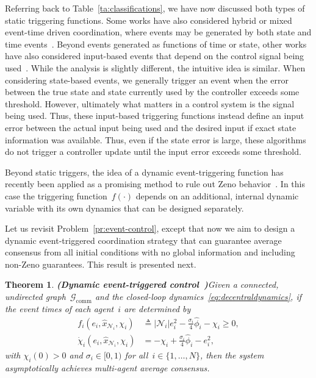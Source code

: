\documentclass{autart}
\newtheorem{theorem}{Theorem}[section]
\newcommand{\GG}{{\mathcal{G}}}
\newcommand{\NN}{{\mathcal{N}}}
\newcommand{\until}[1]{\{1,\dots, #1\}}
\newcommand{\commgraph}{\GG_\text{comm}}
\renewcommand{\hat}{\widehat}
\newcommand{\longthmtitle}[1]{\mbox{}\textup{\textbf{(#1)}}}
\newcommand{\changes}[1]{{\color{blue} #1}}
\renewcommand{\changes}[1]{#1}
\begin{document}
{Referring back to Table~\ref{ta:classifications}, we have now
  discussed both types of static triggering functions.
  Some works have also considered hybrid or mixed event-time driven
  coordination, where events may be generated by both state and time
  events~\citep{FX-TC:16,FX-TC-HG:16,DPB-WPMHH:14,ZS-NH-BDOA-ZD:16}. Beyond events
  generated as functions of time or state, other works have also
  considered input-based events that depend on the control signal
  being used~\citep{YW-XM-LX-RL-HS-ZW:16,AD-DL-DVD-KHJ:16}. While the
  analysis is slightly different, the intuitive idea is similar. When
  considering state-based events, we generally trigger an event when
  the error between the true state and state currently used by the
  controller exceeds some threshold. However, ultimately what matters
  in a control system is the signal being used. Thus, these
  input-based triggering functions instead define an input error
  between the actual input being used and the desired input if exact
  state information was available. Thus, even if the state error is
  large, these algorithms do not trigger a controller update until the
  input error exceeds some threshold.

  Beyond static triggers, the idea of a dynamic event-triggering
  function has recently been applied as a promising method to rule out
  Zeno
  behavior~\citep{VSD-WPMHH:15,AG:17,XY-KL-DVD-KHJ:17,VSD-DPB-WPMHH:17}.
  In this case the triggering function~$f(\cdot)$ depends on an
  additional, internal dynamic variable with its own dynamics that can
  be designed separately.
  
  Let us revisit Problem~\ref{pr:event-control}, except that now we
  aim to design a dynamic event-triggered coordination strategy that
  can guarantee average consensus from all initial conditions with no
  global information and including non-Zeno guarantees. This result is
  presented next.

  \begin{theorem}\longthmtitle{Dynamic event-triggered
      control~\citep{XY-KL-DVD-KHJ:17}}\label{th:dynamic}
    Given {a connected, undirected graph~$\commgraph$ and} the
    closed-loop dynamics~\eqref{eq:decentraldynamics}, if the event
    times of each agent~$i$ are determined by
    \begin{subequations}\label{eq:dynamictrigger}
      \begin{align}
        f_i(e_i, \hat{x}_{ \NN_i}, \chi_i ) &\triangleq
        |\NN_i| e_i^2 - \frac{ \sigma_i}{4} \hat{\phi}_i - \chi_i \geq
        0,
        \\
        \changes{\dot{\chi}_i(e_i, \hat{x}_{\NN_i}, \chi_i)} &= -\chi_i + \frac{\sigma_i}{4} \hat{\phi}_i - e_i^2   ,
      \end{align}      
    \end{subequations}
    with $\chi_i(0) > 0$ and $\sigma_i
    \in [0,1)$ for all~$i \in \until{N}$, then the system
    asymptotically achieves multi-agent average consensus.
  \end{theorem}
}
\end{document}
